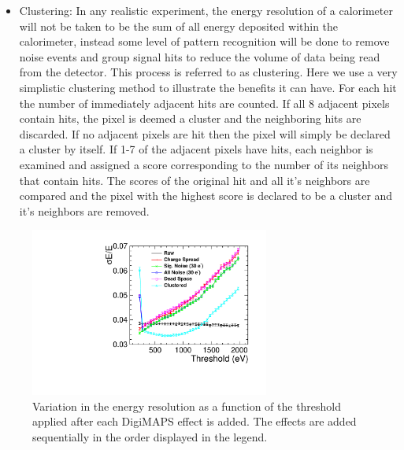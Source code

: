 \begin{itemize}
\item Clustering: In any realistic experiment, the energy resolution of a calorimeter will not be taken to be the sum of all energy deposited within the calorimeter, instead some level of pattern recognition will be done to remove noise events and group signal hits to reduce the volume of data being read from the detector. This process is referred to as clustering. Here we use a very simplistic clustering method to illustrate the benefits it can have. For each hit the number of immediately adjacent hits are counted. If all 8 adjacent pixels contain hits, the pixel is deemed a cluster and the neighboring hits are discarded. If no adjacent pixels are hit then the pixel will simply be declared a cluster by itself. If 1-7 of the adjacent pixels have hits, each neighbor is examined and assigned a score corresponding to the number of its neighbors that contain hits. The scores of the original hit and all it's neighbors are compared and the pixel with the highest score is declared to be a cluster and it's neighbors are removed.  
\end{itemize}

\begin{figure}
  \centering
  \includegraphics[width=0.7\textwidth,keepaspectratio]{DECALStudies/fig/ThresholdScan.pdf}
  \caption{Variation in the energy resolution as a function of the threshold applied after each DigiMAPS effect is added. The effects are added sequentially in the order displayed in the legend.}
  \label{fig:digimapseffects}
\end{figure}

